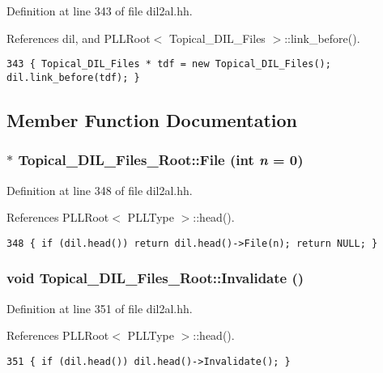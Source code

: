 Definition at line 343 of file dil2al.hh.

References dil, and PLLRoot$<$ Topical\_\-DIL\_\-Files $>$::link\_\-before().



\footnotesize\begin{verbatim}343 { Topical_DIL_Files * tdf = new Topical_DIL_Files(); dil.link_before(tdf); }
\end{verbatim}\normalsize 


\subsection{Member Function Documentation}
\subsubsection{$\ast$ Topical\_\-DIL\_\-Files\_\-Root::File (int {\em n} = 0)\hspace{0.3cm}{\tt  [inline]}}\label{classTopical__DIL__Files__Root_a2}




Definition at line 348 of file dil2al.hh.

References PLLRoot$<$ PLLType $>$::head().



\footnotesize\begin{verbatim}348 { if (dil.head()) return dil.head()->File(n); return NULL; }
\end{verbatim}\normalsize 
{}
\subsubsection{\setlength{\rightskip}{0pt plus 5cm}void Topical\_\-DIL\_\-Files\_\-Root::Invalidate ()\hspace{0.3cm}{\tt  [inline]}}\label{classTopical__DIL__Files__Root_a5}




Definition at line 351 of file dil2al.hh.

References PLLRoot$<$ PLLType $>$::head().



\footnotesize\begin{verbatim}351 { if (dil.head()) dil.head()->Invalidate(); }
\end{verbatim}\normalsize 
{}
